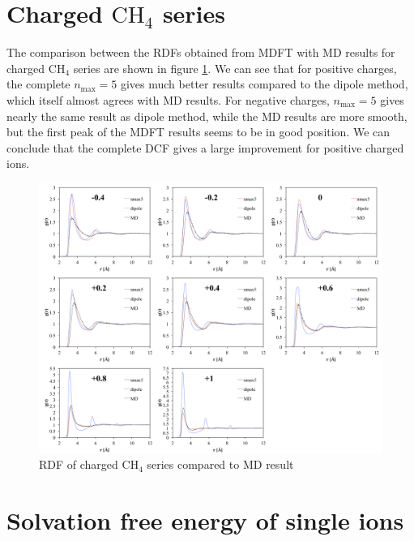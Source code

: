 \section{Charged $\mathrm{CH_{4}}$ series}

The comparison between the \acs{RDF}s obtained from \acs{MDFT} with
\acs{MD} results for charged $\mathrm{CH_{4}}$ series are shown
in figure \ref{fig:Comparison-to-MD}. We can see that for positive
charges, the complete $n_{\max}=5$ gives much better results compared
to the dipole method, which itself almost agrees with \acs{MD} results.
For negative charges, $n_{\max}=5$ gives nearly the same result as
dipole method, while the \acs{MD} results are more smooth, but the
first peak of the \acs{MDFT} results seems to be in good position.
We can conclude that the complete \acs{DCF} gives a large improvement
for positive charged ions.

\begin{figure}[h]
\begin{centering}
\includegraphics[width=1\columnwidth]{_figure/results/ch4_md}
\par\end{centering}
\caption{\acs{RDF} of charged $\mathrm{CH_{4}}$ series compared to \acs{MD}
result\label{fig:Comparison-to-MD}}
\end{figure}


\section{Solvation free energy of single ions}

